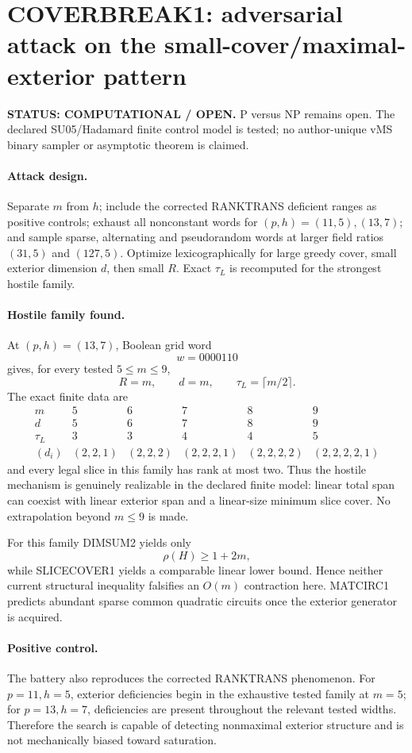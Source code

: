 \documentclass[11pt]{article}\usepackage[margin=.88in]{geometry}\usepackage{amsmath,amssymb}
\begin{document}
\section*{COVERBREAK1: adversarial attack on the small-cover/maximal-exterior pattern}
\textbf{STATUS: COMPUTATIONAL / OPEN.} P versus NP remains open. The declared SU05/Hadamard finite control model is tested; no author-unique vMS binary sampler or asymptotic theorem is claimed.

\paragraph{Attack design.}
Separate \(m\) from \(h\); include the corrected RANKTRANS deficient ranges as positive controls; exhaust all nonconstant words for \((p,h)=(11,5),(13,7)\); and sample sparse, alternating and pseudorandom words at larger field ratios \((31,5)\) and \((127,5)\). Optimize lexicographically for large greedy cover, small exterior dimension \(d\), then small \(R\). Exact \(\tau_L\) is recomputed for the strongest hostile family.

\paragraph{Hostile family found.}
At \((p,h)=(13,7)\), Boolean grid word
\[
w=0000110
\]
gives, for every tested \(5\le m\le9\),
\[
\boxed{R=m,\qquad d=m,\qquad \tau_L=\lceil m/2\rceil.}
\]
The exact finite data are
\[
\begin{array}{c|ccccc}
m&5&6&7&8&9\\\hline
d&5&6&7&8&9\\
\tau_L&3&3&4&4&5\\
(d_i)&(2,2,1)&(2,2,2)&(2,2,2,1)&(2,2,2,2)&(2,2,2,2,1)
\end{array}
\]
and every legal slice in this family has rank at most two. Thus the hostile mechanism is genuinely realizable in the declared finite model: linear total span can coexist with linear exterior span and a linear-size minimum slice cover. No extrapolation beyond \(m\le9\) is made.

For this family DIMSUM2 yields only
\[
\rho(H)\ge1+2m,
\]
while SLICECOVER1 yields a comparable linear lower bound. Hence neither current structural inequality falsifies an \(O(m)\) contraction here. MATCIRC1 predicts abundant sparse common quadratic circuits once the exterior generator is acquired.

\paragraph{Positive control.}
The battery also reproduces the corrected RANKTRANS phenomenon. For \(p=11,h=5\), exterior deficiencies begin in the exhaustive tested family at \(m=5\); for \(p=13,h=7\), deficiencies are present throughout the relevant tested widths. Therefore the search is capable of detecting nonmaximal exterior structure and is not mechanically biased toward saturation.
\end{document}
